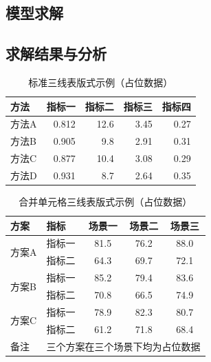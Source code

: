 \documentclass{MathorCupmodeling}
\begin{document}
\subsection{模型求解}

\subsection{求解结果与分析}

\begin{table}[H]
	\centering
	\small
	\setlength{\tabcolsep}{6pt}
	\caption{标准三线表版式示例（占位数据）}
	\label{tab:booktabs_demo}
	\begin{tabular}{lrrrr}
		\toprule
		方法 & 指标一 & 指标二 & 指标三 & 指标四 \\
		\midrule
		方法A & 0.812 & 12.6 & 3.45 & 0.27 \\
		方法B & 0.905 & 9.8  & 2.91 & 0.31 \\
		方法C & 0.877 & 10.4 & 3.08 & 0.29 \\
		方法D & 0.931 & 8.7  & 2.64 & 0.35 \\
		\bottomrule
	\end{tabular}
\end{table}

\begin{table}[H]
	\centering
	\small
	\setlength{\tabcolsep}{8pt}
	\caption{合并单元格三线表版式示例（占位数据）}
	\label{tab:multirow_demo}
	\begin{tabular}{llccc}
		\toprule
		方案 & 指标 & 场景一 & 场景二 & 场景三 \\
		\midrule
		\multirow{2}{*}{方案A} & 指标一 & 81.5 & 76.2 & 88.0 \\
		& 指标二 & 64.3 & 69.7 & 72.1 \\
		\midrule
		\multirow{2}{*}{方案B} & 指标一 & 85.2 & 79.4 & 83.6 \\
		& 指标二 & 70.8 & 66.5 & 74.9 \\
		\midrule
		\multirow{2}{*}{方案C} & 指标一 & 78.9 & 82.3 & 80.7 \\
		& 指标二 & 61.2 & 71.8 & 68.4 \\
		\midrule
		备注 & \multicolumn{4}{c}{三个方案在三个场景下均为占位数据} \\
		\bottomrule
	\end{tabular}
\end{table}
\end{document}
